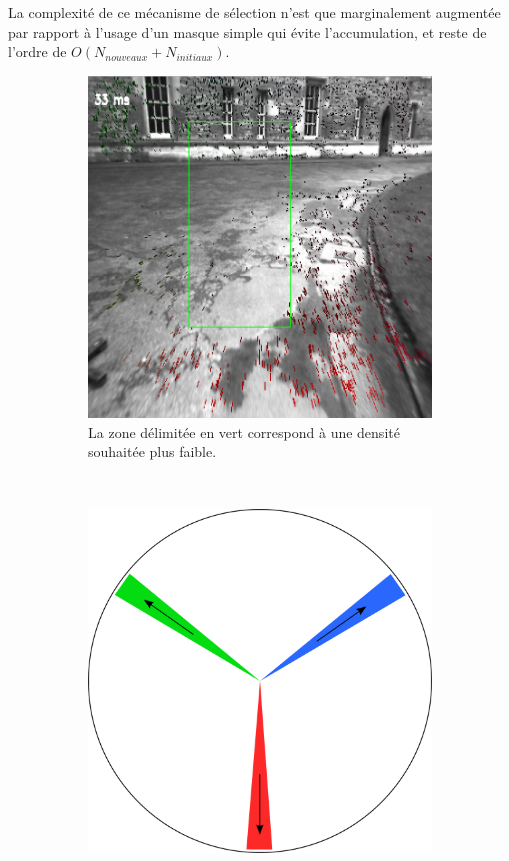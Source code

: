La complexité de ce mécanisme de sélection n'est que marginalement augmentée par rapport à l'usage d'un masque simple qui évite l'accumulation, et reste de l'ordre de $O(N_{nouveaux} + N_{initiaux})$.

\begin{figure}[h]
	\begin{center}
		\begin{subfigure}{0.58\textwidth}
		\includegraphics[width=\textwidth]{Chapter3/graphics/Detectors_weighted.png}
		\caption{La zone délimitée en vert correspond à une densité souhaitée plus faible.}
		\end{subfigure}	
		~
		\begin{subfigure}{0.38\textwidth}
			\includegraphics[width=\textwidth]{Chapter3/graphics/directions_chroma.png} 

\end{subfigure}
\end{center}
\end{figure}
